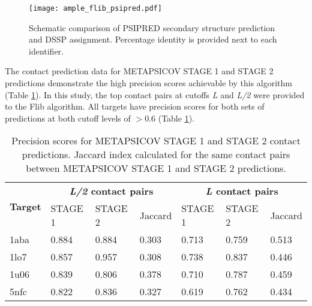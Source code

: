 \begin{figure}[H]
	\centering
	\texttt{[image: ample\_flib\_psipred.pdf]}
	\caption[PSIPRED schema for Flib targets]{Schematic comparison of PSIPRED \cite{Jones1999-fi} secondary structure prediction and DSSP \cite{Frishman1995-ns} assignment. Percentage identity is provided next to each identifier.}
	\label{fig:ample_flib_psipred}
\end{figure}

The contact prediction data for METAPSICOV STAGE 1 and STAGE 2 predictions demonstrate the high precision scores achievable by this algorithm (Table \ref{table:ample_flib_contact_precision}). In this study, the top contact pairs at cutoffs \textit{L} and \textit{L/2} were provided to the Flib algorithm. All targets have precision scores for both sets of predictions at both cutoff levels of $>0.6$ (Table \ref{table:ample_flib_contact_precision}).

\begin{table}[H]
  \centering
  \begin{tabularx}{\textwidth}{|X|X|X|X|X|X|X|}
      \hline
	  \multirow{2}{*}{\textbf{Target}} & \multicolumn{3}{c|}{\textbf{\textit{L/2} contact pairs}} & \multicolumn{3}{c|}{\textbf{\textit{L} contact pairs}} 	\\ \cline{2-7}
	  							&  	STAGE 1	& 	STAGE 2	& 	Jaccard 	& 	STAGE 1 	& 	STAGE 2 	& 	Jaccard	 	\\ \hline
	  1aba						&	0.884	&	0.884	&	0.303	&	0.713	&	0.759	&	0.513		\\ \hline
	  1lo7						&	0.857	&	0.957	&	0.308	&	0.738	&	0.837	&	0.446		\\ \hline
	  1u06						&	0.839	&	0.806	&	0.378	&	0.710	&	0.787	&	0.459		\\ \hline
	  5nfc						&	0.822	&	0.836	&	0.327	&	0.619	&	0.762	&	0.434		\\ \hline
  \end{tabularx}
  \caption[Contact prediction summary for Flib targets]{Precision scores for METAPSICOV \cite{Jones2015-wp} STAGE 1 and STAGE 2 contact predictions. Jaccard index calculated for the same contact pairs between METAPSICOV STAGE 1 and STAGE 2 predictions.}
  \label{table:ample_flib_contact_precision}
\end{table}

